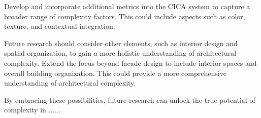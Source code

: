  Develop and incorporate additional metrics into the CICA system to capture a broader range of complexity factors.
This could include aspects such as color, texture, and contextual integration.

Future research should consider other elements, such as interior design and spatial organization, to gain a more holistic understanding of architectural complexity.
Extend the focus beyond facade design to include interior spaces and overall building organization. This could provide a more comprehensive understanding of architectural complexity.


By embracing these possibilities, future research can unlock the true potential of complexity in ......






